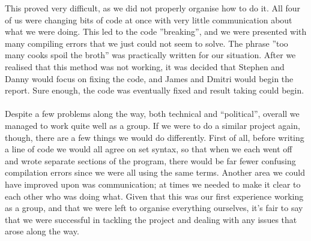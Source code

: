 \documentclass[12pt]{report}
\begin{document}
This proved very difficult, as we did not properly organise how to do it. All four of us were changing bits of code at once with very little communication about what we were doing. This led to the code ''breaking'', and we were presented with many compiling errors that we just could not seem to solve. The phrase ''too many cooks spoil the broth'' was practically written for our situation.
After we realised that this method was not working, it was decided that Stephen and Danny would focus on fixing the code, and James and Dmitri would begin the report. Sure enough, the code was eventually fixed and result taking could begin. \\ \\ 
Despite a few problems along the way, both technical and “political”, overall we managed to work quite well as a group. If we were to do a similar project again, though, there are a few things we would do differently. First of all, before writing a line of code we would all agree on set syntax, so that when we each went off and wrote separate sections of the program, there would be far fewer confusing compilation errors since we were all using the same terms. Another area we could have improved upon was communication; at times we needed to make it clear to each other who was doing what.
 Given that this was our first experience working as a group, and that we were left to organise everything ourselves, it’s fair to say that we were successful in tackling the project and dealing with any issues that arose along the way.
\end{document}
